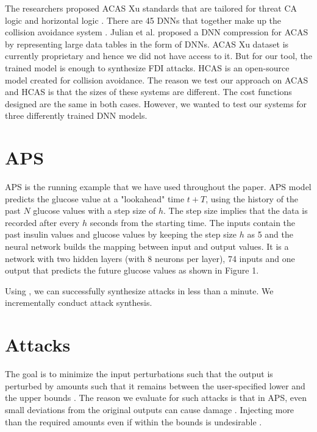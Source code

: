 The researchers proposed ACAS Xu standards that are tailored for threat CA logic and horizontal logic \cite{7778055}. 
There are 45 DNNs that together make up the collision avoidance system \cite{Julian_2019}.  
Julian et al. \cite{} proposed a DNN compression for ACAS by representing large data tables in the form of DNNs. ACAS Xu dataset is currently proprietary and hence we did not have access to it. But for our tool, the trained model is enough to synthesize FDI attacks. HCAS is an open-source model created for collision avoidance. The reason we test our approach on ACAS and HCAS is that the sizes of these systems are different. The cost functions designed are the same in both cases. However, we wanted to test our systems for three differently trained DNN models. 

\section{APS}
APS is the running example that we have used throughout the paper. 
APS model predicts the glucose value at a "lookahead" time $t + T$, using the history of the past $N$ glucose values with a step size of $h$. The step size implies that the data is recorded after every $h$ seconds from the starting time. The inputs contain the past insulin values and glucose values by keeping the step size $h$ as 5 and the neural network builds the mapping between input and output values. It is a network with two hidden layers (with 8 neurons per layer), 74 inputs and one output that predicts the future glucose values as shown in Figure 1. 

Using \tool, we can successfully synthesize attacks in less than a minute. 
We incrementally conduct attack synthesis. 

\section{Attacks}
The goal is to minimize the input perturbations such that the output is perturbed by amounts such that it remains between the user-specified lower and the upper bounds . The reason we evaluate for such attacks is that in APS, even small deviations from the original outputs can cause damage . Injecting more than the required amounts even if within the bounds is undesirable .

